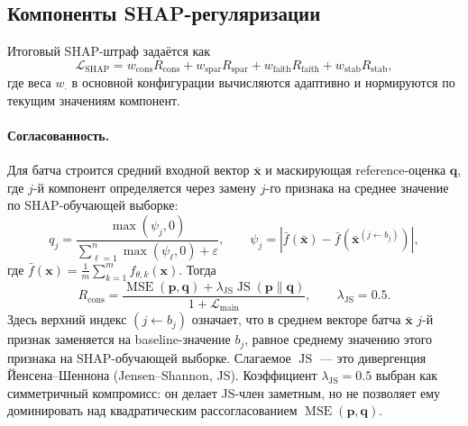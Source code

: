 \subsection{Компоненты SHAP-регуляризации}

Итоговый SHAP-штраф задаётся как
\begin{equation}
\mathcal{L}_{\mathrm{SHAP}} = w_{\mathrm{cons}} R_{\mathrm{cons}} + w_{\mathrm{spar}} R_{\mathrm{spar}} + w_{\mathrm{faith}} R_{\mathrm{faith}} + w_{\mathrm{stab}} R_{\mathrm{stab}},
\end{equation}
где веса $w_{\cdot}$ в основной конфигурации вычисляются адаптивно и нормируются по текущим значениям компонент.

\paragraph{Согласованность.}
Для батча строится средний входной вектор $\bar{\mathbf{x}}$ и маскирующая reference-оценка $\mathbf{q}$, где $j$-й компонент определяется через замену $j$-го признака на среднее значение по SHAP-обучающей выборке:
\begin{equation}
q_j = \frac{\max(\psi_j, 0)}{\sum_{\ell=1}^{n} \max(\psi_{\ell}, 0) + \varepsilon},
\qquad
\psi_j = \left|\bar{f}(\bar{\mathbf{x}}) - \bar{f}(\bar{\mathbf{x}}^{(j \leftarrow b_j)})\right|,
\end{equation}
где $\bar{f}(\mathbf{x}) = \frac{1}{m}\sum_{k=1}^{m} f_{\theta,k}(\mathbf{x})$. Тогда
\begin{equation}
R_{\mathrm{cons}} = \frac{\operatorname{MSE}(\mathbf{p},\mathbf{q}) + \lambda_{\mathrm{JS}} \operatorname{JS}(\mathbf{p}\|\mathbf{q})}{1 + \mathcal{L}_{\mathrm{main}}},
\qquad \lambda_{\mathrm{JS}} = 0.5.
\end{equation}
Здесь верхний индекс $(j \leftarrow b_j)$ означает, что в среднем векторе батча $\bar{\mathbf{x}}$ $j$-й признак заменяется на baseline-значение $b_j$, равное среднему значению этого признака на SHAP-обучающей выборке. Слагаемое $\operatorname{JS}$ --- это дивергенция Йенсена--Шеннона (Jensen--Shannon, JS). Коэффициент $\lambda_{\mathrm{JS}}=0.5$ выбран как симметричный компромисс: он делает JS-член заметным, но не позволяет ему доминировать над квадратическим рассогласованием $\operatorname{MSE}(\mathbf{p},\mathbf{q})$.

